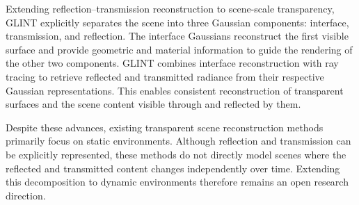 Extending reflection--transmission reconstruction to scene-scale transparency, GLINT \cite{na2026} explicitly separates the scene into three Gaussian components: interface, transmission, and reflection. The interface Gaussians reconstruct the first visible surface and provide geometric and material information to guide the rendering of the other two components. GLINT combines interface reconstruction with ray tracing to retrieve reflected and transmitted radiance from their respective Gaussian representations. This enables consistent reconstruction of transparent surfaces and the scene content visible through and reflected by them.

Despite these advances, existing transparent scene reconstruction methods primarily focus on static environments. Although reflection and transmission can be explicitly represented, these methods do not directly model scenes where the reflected and transmitted content changes independently over time. Extending this decomposition to dynamic environments therefore remains an open research direction.

